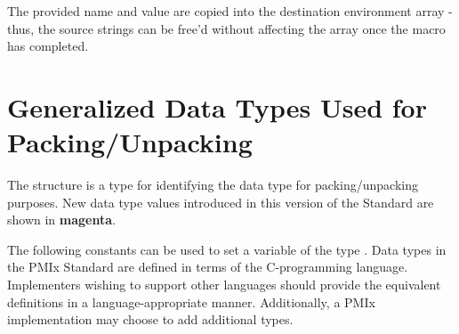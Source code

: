 \adviceuserstart
The provided name and value are copied into the destination environment array - thus, the source strings can be free'd without affecting the array once the macro has completed.
\adviceuserend


\section{Generalized Data Types Used for Packing/Unpacking}

The  structure is a  type for identifying the data type for packing/unpacking purposes. New data type values introduced in this version of the Standard are shown in \textbf{\color{magenta}magenta}.

\adviceimplstart
The following constants can be used to set a variable of the type . Data types in the \ac{PMIx} Standard are defined in terms of the C-programming language. Implementers wishing to support other languages should provide the equivalent definitions in a language-appropriate manner. Additionally, a PMIx implementation may choose to add additional types.
\adviceimplend

